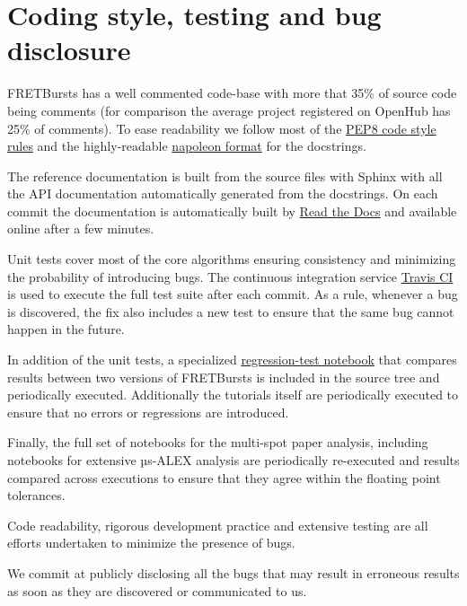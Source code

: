 \section{Coding style, testing and bug disclosure}

FRETBursts has a well commented code-base with more that 35\% of source code
being comments (for comparison the average project registered on OpenHub has 25\%
of comments). To ease readability we follow most of the 
\href{https://www.python.org/dev/peps/pep-0008/}{PEP8 code style rules} and 
the highly-readable \href{http://sphinxcontrib-napoleon.readthedocs.org/}{napoleon format}
for the docstrings.

The reference documentation is built from the source files with Sphinx with
all the API documentation automatically generated from the docstrings.
On each commit the documentation is automatically built by 
\href{https://readthedocs.org/}{Read the Docs}
and available online after a few minutes.

Unit tests cover most of the core algorithms ensuring consistency and 
minimizing the probability of introducing bugs. The continuous integration
service \href{http://travis-ci.org}{Travis CI} is used to execute the full
test suite after each commit.
As a rule, whenever a bug is discovered, the  fix also includes a new test 
to ensure that the same bug cannot happen in the future.

In addition of the unit tests, a specialized 
\href{https://github.com/tritemio/FRETBursts/blob/master/notebooks/dev/tests/FRETBursts\%20-\%20Regression\%20tests.ipynb}{regression-test notebook}
that compares results between two versions of FRETBursts is
included in the source tree and periodically executed. Additionally
the tutorials itself are periodically executed to ensure that
no errors or regressions are introduced.

Finally, the full set of notebooks for the multi-spot paper analysis,
including notebooks for extensive µs-ALEX analysis are periodically
re-executed and results compared across executions to ensure that 
they agree within the floating point tolerances.

Code readability, rigorous development practice and extensive testing
are all efforts undertaken to minimize the presence of bugs.

We commit at publicly disclosing all the bugs that may result in erroneous results 
as soon as they are discovered or communicated to us.
